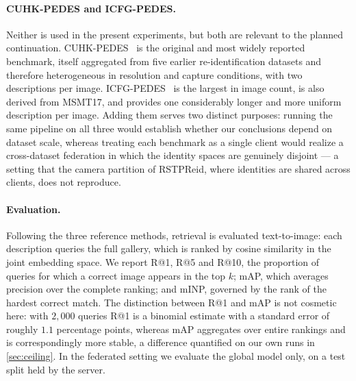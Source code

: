 \paragraph{CUHK-PEDES and ICFG-PEDES.} Neither is used in the present experiments, but both are relevant to the planned continuation. CUHK-PEDES~\citep{li2017personsearchnaturallanguage} is the original and most widely reported benchmark, itself aggregated from five earlier re-identification datasets and therefore heterogeneous in resolution and capture conditions, with two descriptions per image. ICFG-PEDES~\citep{ding2021semanticallyselfalignednetworktexttoimage} is the largest in image count, is also derived from MSMT17, and provides one considerably longer and more uniform description per image. Adding them serves two distinct purposes: running the same pipeline on all three would establish whether our conclusions depend on dataset scale, whereas treating each benchmark as a single client would realize a cross-dataset federation in which the identity spaces are genuinely disjoint --- a setting that the camera partition of RSTPReid, where identities are shared across clients, does not reproduce.

\paragraph{Evaluation.} Following the three reference methods, retrieval is evaluated text-to-image: each description queries the full gallery, which is ranked by cosine similarity in the joint embedding space. We report R@1, R@5 and R@10, the proportion of queries for which a correct image appears in the top $k$; mAP, which averages precision over the complete ranking; and mINP, governed by the rank of the hardest correct match. The distinction between R@1 and mAP is not cosmetic here: with $2{,}000$ queries R@1 is a binomial estimate with a standard error of roughly $1.1$ percentage points, whereas mAP aggregates over entire rankings and is correspondingly more stable, a difference quantified on our own runs in \cref{sec:ceiling}. In the federated setting we evaluate the global model only, on a test split held by the server.
